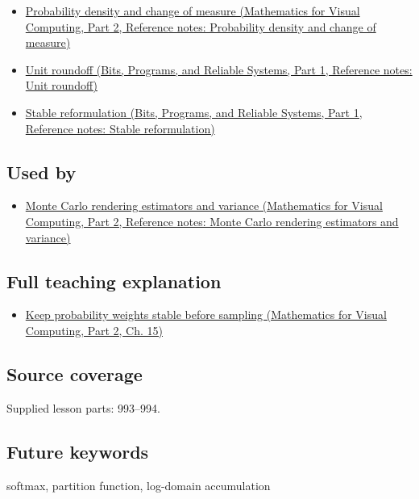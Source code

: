 \begin{itemize}
\tightlist
\item
  \href{../02-Mathematics-for-Visual-Computing-P02/main.pdf\#nameddest=appendix-4815cd87ab8b}{Probability density and change of measure (Mathematics for Visual Computing, Part 2, Reference notes: Probability density and change of measure)}
\item
  \href{../01-Bits-Programs-and-Reliable-Systems-P01/main.pdf\#nameddest=appendix-bc44f7b42f42}{Unit roundoff (Bits, Programs, and Reliable Systems, Part 1, Reference notes: Unit roundoff)}
\item
  \href{../01-Bits-Programs-and-Reliable-Systems-P01/main.pdf\#nameddest=appendix-d7f8ba961670}{Stable reformulation (Bits, Programs, and Reliable Systems, Part 1, Reference notes: Stable reformulation)}
\end{itemize}

\subsection{Used by}\label{appendix-d580b422240f-used-by}

\hypertarget{appendix-d580b422240f-used-by}{}

\begin{itemize}
\tightlist
\item
  \href{../02-Mathematics-for-Visual-Computing-P02/main.pdf\#nameddest=appendix-031e02bf28af}{Monte Carlo rendering estimators and variance (Mathematics for Visual Computing, Part 2, Reference notes: Monte Carlo rendering estimators and variance)}
\end{itemize}

\subsection{Full teaching explanation}\label{appendix-d580b422240f-full-teaching-explanation}

\hypertarget{appendix-d580b422240f-full-teaching-explanation}{}

\begin{itemize}
\tightlist
\item
  \href{../02-Mathematics-for-Visual-Computing-P02/main.pdf\#nameddest=02-foundations-ii-ch031-keep-probability-weights-stable-before-sampling}{Keep probability weights stable before sampling (Mathematics for Visual Computing, Part 2, Ch. 15)}
\end{itemize}

\subsection{Source coverage}\label{appendix-d580b422240f-source-coverage}

\hypertarget{appendix-d580b422240f-source-coverage}{}

Supplied lesson parts: 993--994.

\subsection{Future keywords}\label{appendix-d580b422240f-future-keywords}

\hypertarget{appendix-d580b422240f-future-keywords}{}

softmax, partition function, log-domain accumulation

